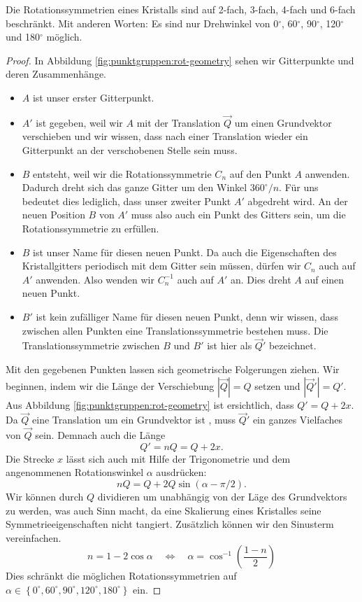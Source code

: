 \begin{satz}
   Die Rotationssymmetrien eines Kristalls sind auf 2-fach, 3-fach, 4-fach und 6-fach beschränkt.
   Mit anderen Worten: Es sind nur Drehwinkel von
    0\(^{\circ}\),
    60\(^{\circ}\),
    90\(^{\circ}\),
    120\(^{\circ}\) und
    180\(^{\circ}\)
   m\"oglich.
\end{satz}

\begin{proof}
 In Abbildung \ref{fig:punktgruppen:rot-geometry} sehen wir Gitterpunkte und deren Zusammenhänge.

 \begin{itemize}
     \item  \(A\) ist unser erster Gitterpunkt. 

     \item  \(A'\) ist gegeben, weil wir \(A\) mit der Translation \(\vec{Q}\) um einen Grundvektor verschieben und wir wissen, 
            dass nach einer Translation wieder ein Gitterpunkt an der verschobenen Stelle sein muss.
     \item \(B\) entsteht, weil wir die Rotationssymmetrie \(C_n\) auf den Punkt \(A\) anwenden.
         Dadurch dreht sich das ganze Gitter um den Winkel \(360^\circ/n\). 
         Für uns bedeutet dies lediglich, dass unser zweiter Punkt \(A'\) abgedreht wird.
         An der neuen Position \(B\) von \(A'\) muss also auch ein Punkt des Gitters sein, um die Rotationssymmetrie zu erfüllen.
     \item \(B\) ist unser Name für diesen neuen Punkt.
         Da auch die Eigenschaften des Kristallgitters periodisch mit dem Gitter sein müssen, dürfen wir \(C_n\) auch auf \(A'\) anwenden.
         Also wenden wir \(C_n^{-1}\) auch auf \(A'\) an. 
         Dies dreht \(A\) auf einen neuen Punkt.
     \item \(B'\) ist kein zufälliger Name für diesen neuen Punkt, denn wir wissen, dass zwischen allen Punkten eine Translationssymmetrie bestehen muss.
         Die  Translationssymmetrie zwischen \(B\) und \(B'\) ist hier als \(\vec{Q}'\) bezeichnet.
 \end{itemize}  
 Mit den gegebenen Punkten lassen sich geometrische Folgerungen ziehen.
 Wir beginnen, indem wir die Länge der Verschiebung \(|\vec{Q}| = Q\) setzen und \(|\vec{Q}'| = Q'\).
 Aus Abbildung \ref{fig:punktgruppen:rot-geometry} ist ersichtlich, dass \(Q' = Q + 2x\).
 Da \(\vec{Q}\) eine Translation um ein Grundvektor ist , muss \(\vec{Q}'\) ein ganzes Vielfaches von \(\vec{Q}\) sein.
 Demnach auch die Länge
 \[
    Q' = nQ = Q + 2x .
 \]
 Die Strecke \(x\) lässt sich auch mit Hilfe der Trigonometrie und dem angenommenen Rotationswinkel \(\alpha\) ausdrücken:
 \[
    nQ = Q + 2Q\sin(\alpha - \pi/2) .
 \]
 Wir können durch \(Q\) dividieren um unabhängig von der Läge des Grundvektors zu werden, was auch Sinn macht, 
 da eine Skalierung eines Kristalles seine Symmetrieeigenschaften nicht tangiert.
 Zusätzlich können wir den Sinusterm vereinfachen.
 \[
     n = 1 - 2\cos\alpha \quad\iff\quad
     \alpha = \cos^{-1}\left(\frac{1-n}{2}\right)
 \]
 Dies schränkt die möglichen Rotationssymmetrien auf 
 \(
     \alpha \in \left\{ 0^\circ, 60^\circ, 90^\circ, 120^\circ, 180^\circ\right\}
 \)
ein.
\end{proof}

